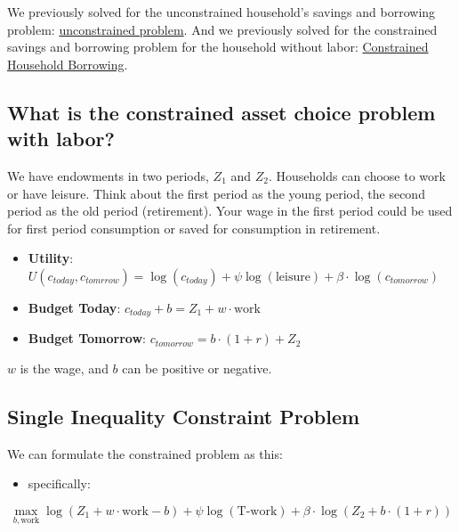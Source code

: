 \documentclass[
]{book}
\providecommand{\tightlist}{%
  \setlength{\itemsep}{0pt}\setlength{\parskip}{0pt}}
\begin{document}
We previously solved for the unconstrained household's savings and
borrowing problem: \href{https://math4econ.github.io/derivative_application/K_save_households.html}{unconstrained
problem}.
And we previously solved for the constrained savings and borrowing
problem for the household without labor: \href{https://math4econ.github.io/opti_hh_constrained_brsv/household_borrow_constrained.html}{Constrained Household
Borrowing}.

\hypertarget{what-is-the-constrained-asset-choice-problem-with-labor}{%
\subsection{What is the constrained asset choice problem with labor?}\label{what-is-the-constrained-asset-choice-problem-with-labor}}

We have endowments in two periods, \(Z_1\) and \(Z_2\). Households can
choose to work or have leisure. Think about the first period as the
young period, the second period as the old period (retirement). Your
wage in the first period could be used for first period consumption or
saved for consumption in retirement.

\begin{itemize}
\item
  \textbf{Utility}:
  \(U(c_{today} ,c_{tomrrow} )=\log (c_{today} )+\psi \log (\textrm{leisure})+\beta \cdot \log (c_{tomorrow} )\)
\item
  \textbf{Budget Today}: \(c_{today} +b=Z_1 +w\cdot \textrm{work}\)
\item
  \textbf{Budget Tomorrow}: \(c_{tomorrow} =b\cdot (1+r)+Z_2\)
\end{itemize}

\(w\) is the wage, and \(b\) can be positive or negative.

\hypertarget{single-inequality-constraint-problem}{%
\subsection{Single Inequality Constraint Problem}\label{single-inequality-constraint-problem}}

We can formulate the constrained problem as this:

\begin{itemize}
\tightlist
\item
  specifically:
\end{itemize}

\[\max_{b,\textrm{work}} \log (Z_1 +w\cdot \textrm{work}-b)+\psi \log (\textrm{T}\textrm{-}\textrm{work})+\beta \cdot \log (Z_2 +b\cdot (1+r))\]
\end{document}
